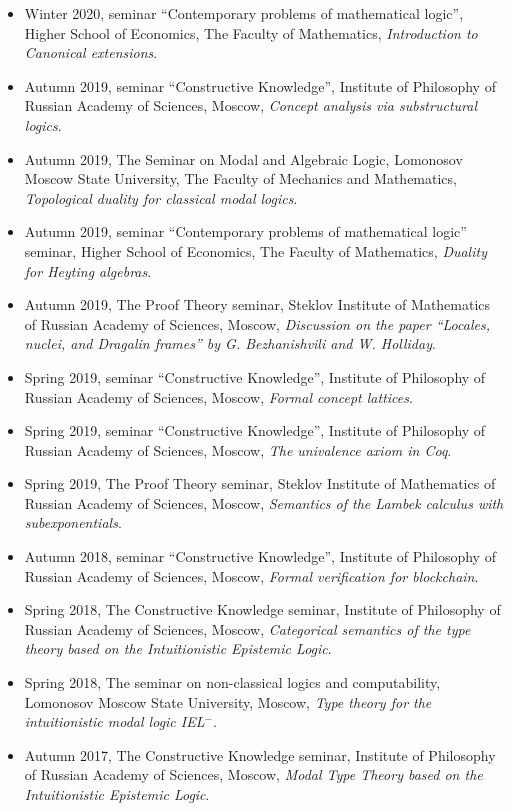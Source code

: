 \documentclass[11pt,a4paper]{article}
\begin{document}
\begin{itemize}[leftmargin=*]
    \item Winter 2020, seminar ``Contemporary problems of mathematical logic'', Higher School of Economics, The Faculty of Mathematics, \textit{Introduction to Canonical extensions}.
    \item Autumn 2019, seminar ``Constructive Knowledge'', Institute of Philosophy of Russian Academy of Sciences, Moscow, \textit{Concept analysis via substructural logics}.
    \item Autumn 2019, The Seminar on Modal and Algebraic Logic, Lomonosov Moscow State University, The Faculty of Mechanics and Mathematics, \textit{Topological duality for classical modal logics}.
    \item Autumn 2019, seminar ``Contemporary problems of mathematical logic'' seminar, Higher School of Economics, The Faculty of Mathematics, \textit{Duality for Heyting algebras}.
    \item Autumn 2019, The Proof Theory seminar, Steklov Institute of Mathematics of Russian Academy of Sciences, Moscow, \textit{Discussion on the paper ``Locales, nuclei, and Dragalin frames'' by G. Bezhanishvili and W. Holliday}.
    \item Spring 2019, seminar ``Constructive Knowledge'', Institute of Philosophy of Russian Academy of Sciences, Moscow, \textit{Formal concept lattices}.
    \item Spring 2019, seminar ``Constructive Knowledge'', Institute of Philosophy of Russian Academy of Sciences, Moscow, \textit{The univalence axiom in Coq}.
    \item Spring 2019, The Proof Theory seminar, Steklov Institute of Mathematics of Russian Academy of Sciences, Moscow, \textit{Semantics of the Lambek calculus with subexponentials}.
    \item Autumn 2018, seminar ``Constructive Knowledge'', Institute of Philosophy of Russian Academy of Sciences, Moscow, \textit{Formal verification for blockchain}.
    \item Spring 2018, The Constructive Knowledge seminar, Institute of Philosophy of Russian Academy of Sciences, Moscow, \textit{Categorical semantics of the type theory based on the Intuitionistic Epistemic Logic}.
    \item Spring 2018, The seminar on non-classical logics and computability, Lomonosov Moscow State University, Moscow, \textit{Type theory for the intuitionistic modal logic IEL$^-$}.
    \item Autumn 2017, The Constructive Knowledge seminar, Institute of Philosophy of Russian Academy of Sciences, Moscow, \textit{Modal Type Theory based on the Intuitionistic Epistemic Logic}.

\end{itemize}
\end{document}
